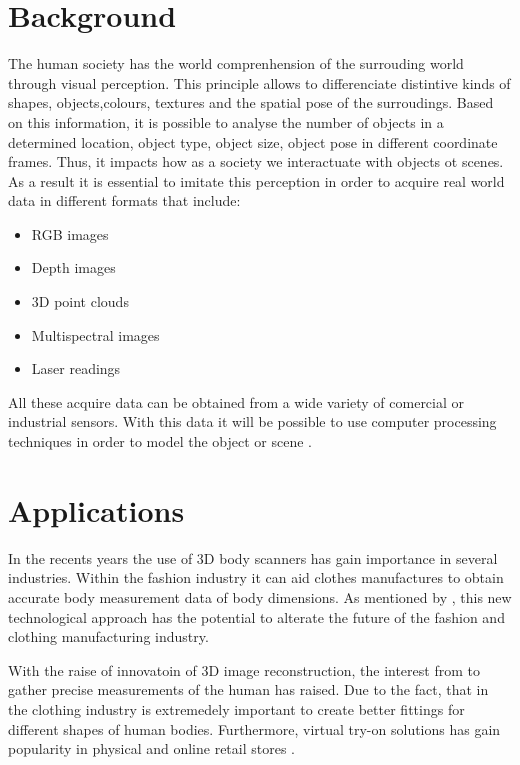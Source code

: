 \documentclass[12pt]{report}
\begin{document}
\enlargethispage{\baselineskip}

\section{Background}
The human society has the world comprenhension of the surrouding world through visual perception. This principle allows to differenciate distintive kinds of shapes, objects,colours, textures and the spatial pose of the surroudings.
Based on this information, it is possible to analyse the number of objects in a determined location, object type, object size, object pose in different coordinate frames. 
Thus, it impacts how as a society we interactuate with objects ot scenes. As a result it is essential to imitate this perception in order to acquire real world data in different formats that include:
\begin{itemize}[]
    \item RGB images
     \item Depth images
     \item 3D point clouds 
     \item Multispectral images
     \item Laser readings
\end{itemize}
All these acquire data can be obtained from a wide variety of comercial or industrial sensors. With this data it will be possible to use computer processing techniques in order to model the object or scene \citep*{murcia_monroy_mora_2018}.

\section{Applications}
In the recents years the use of 3D body scanners has gain importance in several industries. Within the fashion industry it can aid clothes manufactures to obtain accurate body measurement data of body dimensions.
As mentioned by \citet*{sturm_bylow_kahl_cremers_2013}, this new technological approach has the potential to alterate the future of the fashion and clothing manufacturing industry.

With the raise of innovatoin of 3D image reconstruction, the interest from to gather precise measurements of the human has raised. Due to the fact, that in the clothing industry
is extremedely important to create better fittings for different shapes of human bodies. 
Furthermore, virtual try-on solutions has gain popularity in physical and online retail stores .
\end{document}
